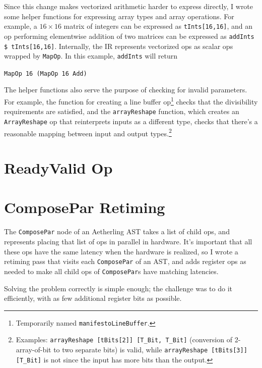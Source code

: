 \documentclass[12pt]{article}
\begin{document}
Since this change makes vectorized arithmetic harder to express
directly, I wrote some helper functions for expressing array types and
array operations. For example, a $16\times 16$ matrix of integers can
be expressed as \texttt{tInts[16,16]}, and an op performing
elementwise addition of two matrices can be expressed as
\texttt{addInts \$ tInts[16,16]}. Internally, the IR represents
vectorized ops as scalar ops wrapped by \texttt{MapOp}.
In this example, \texttt{addInts} will return

\texttt{MapOp 16 (MapOp 16 Add)}

The helper functions also serve the purpose of checking for invalid
parameters. For example, the function for creating a line buffer
op\footnote{Temporarily named \texttt{manifestoLineBuffer}.} checks that the
divisibility requirements are satisfied, and the \texttt{arrayReshape}
function, which creates an \texttt{ArrayReshape} op that reinterprets
inputs as a different type, checks that there's a reasonable mapping
between input and output types.\footnote{
Examples: \texttt{arrayReshape [tBits[2]] [T\_Bit, T\_Bit]} (conversion of
2-array-of-bit to two separate bits) is valid, while
\texttt{arrayReshape [tBits[3]] [T\_Bit]} is not since the input has
more bits than the output.}

\section{ReadyValid Op}

\section{ComposePar Retiming}

The \texttt{ComposePar} node of an Aetherling AST takes a list of
child ops, and represents placing that list of ops in parallel in
hardware. It's important that all these ops have the same latency when
the hardware is realized, so I wrote a retiming pass that visits each
\texttt{ComposePar} of an AST, and adds register ops as needed to make
all child ops of \texttt{ComposePar}s have matching latencies.

Solving the problem correctly is simple enough; the challenge was to
do it efficiently, with as few additional register bits as possible.
\end{document}
